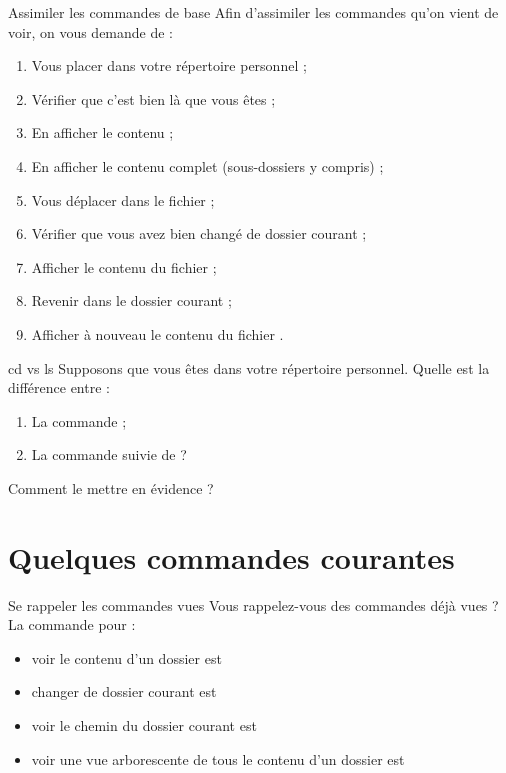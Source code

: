 \documentclass[a4paper,11pt]{style-esi/td}
\begin{document}
		\begin{Exercice}{Assimiler les commandes de base}
			Afin d'assimiler les commandes qu'on vient de voir,
			on vous demande de :
			\begin{enumerate}
				\item Vous placer dans votre répertoire personnel ;
				\item Vérifier que c'est bien là que vous êtes ;
				\item En afficher le contenu ;
				\item En afficher le contenu complet (sous-dossiers y compris) ;
				\item Vous déplacer dans le fichier  ;
				\item Vérifier que vous avez bien changé de dossier courant ;
				\item Afficher le contenu du fichier  ;
				\item Revenir dans le dossier courant ;
				\item Afficher à nouveau le contenu du fichier  .
			\end{enumerate}
		\end{Exercice}

		\begin{Exercice}{cd vs ls}
			Supposons que vous êtes dans votre répertoire personnel.
			Quelle est la différence entre :
			\begin{enumerate}
				\item La commande  ;
				\item La commande  suivie de  ?
			\end{enumerate}
			Comment le mettre en évidence ?
		\end{Exercice}			


	\section{Quelques commandes courantes}

		\begin{Exercice}{Se rappeler les commandes vues}		
			Vous rappelez-vous des commandes déjà vues ?
			La commande pour :
			\begin{itemize}
			\item voir le contenu d'un dossier est  
			\item changer de dossier courant est  
			\item voir le chemin du dossier courant est  
			\item voir une vue arborescente de tous le contenu d'un dossier est  
			\end{itemize}
		\end{Exercice}
\end{document}
